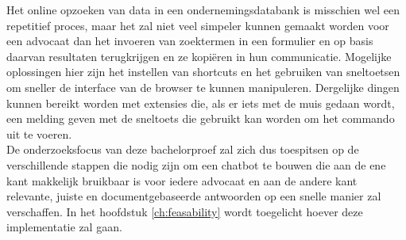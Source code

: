 Het online opzoeken van data in een ondernemingsdatabank is misschien wel een repetitief proces, maar het zal niet veel simpeler kunnen gemaakt worden voor een advocaat dan 
het invoeren van zoektermen in een formulier en op basis daarvan resultaten terugkrijgen en ze kopiëren in hun communicatie. 
Mogelijke oplossingen hier zijn het instellen van shortcuts en het gebruiken van sneltoetsen om sneller de interface van de browser te kunnen manipuleren. 
Dergelijke dingen kunnen bereikt worden met extensies die, als er iets met de muis gedaan wordt, een melding geven met de sneltoets die gebruikt kan worden om het commando uit te voeren. \\ 

De onderzoeksfocus van deze bachelorproef zal zich dus toespitsen op de verschillende stappen die nodig zijn om een chatbot te bouwen die aan de ene kant makkelijk bruikbaar is voor iedere advocaat
en aan de andere kant relevante, juiste en documentgebaseerde antwoorden op een snelle manier zal verschaffen. 
In het hoofdstuk \ref{ch:feasability} wordt toegelicht hoever deze implementatie zal gaan. 
